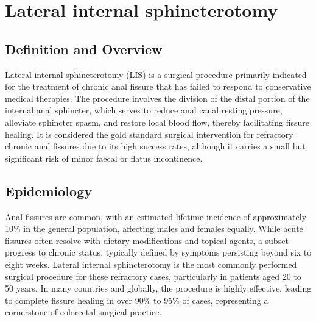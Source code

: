 \chapter{Lateral internal sphincterotomy}

\section*{Definition and Overview}
Lateral internal sphincterotomy (LIS) is a surgical procedure primarily indicated for the treatment of chronic anal fissure that has failed to respond to conservative medical therapies. The procedure involves the division of the distal portion of the internal anal sphincter, which serves to reduce anal canal resting pressure, alleviate sphincter spasm, and restore local blood flow, thereby facilitating fissure healing. It is considered the gold standard surgical intervention for refractory chronic anal fissures due to its high success rates, although it carries a small but significant risk of minor faecal or flatus incontinence.

\section*{Epidemiology}
Anal fissures are common, with an estimated lifetime incidence of approximately 10\% in the general population, affecting males and females equally. While acute fissures often resolve with dietary modifications and topical agents, a subset progress to chronic status, typically defined by symptoms persisting beyond six to eight weeks. Lateral internal sphincterotomy is the most commonly performed surgical procedure for these refractory cases, particularly in patients aged 20 to 50 years. In many countries and globally, the procedure is highly effective, leading to complete fissure healing in over 90\% to 95\% of cases, representing a cornerstone of colorectal surgical practice.


